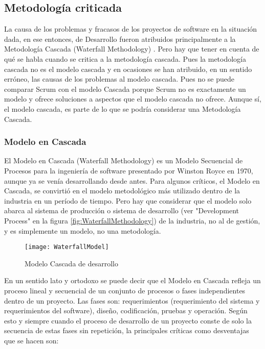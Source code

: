 \subsection{Metodología criticada}

La causa de los problemas y fracasos de los proyectos de software en la situación dada, en ese entonces, de Desarrollo fueron atribuidos principalmente a la Metodología Cascada (Waterfall Methodology) \cite{Ken-Schwaber-1995}. Pero hay que tener en cuenta de qué se habla cuando se critica a la metodología cascada. Pues la metodología cascada no es el modelo cascada y en ocasiones se han atribuido, en un sentido erróneo, las causas de los problemas al modelo cascada. Pues no se puede comparar Scrum con el modelo Cascada porque Scrum no es exactamente un modelo y ofrece soluciones a aspectos que el modelo cascada no ofrece. Aunque sí, el modelo cascada, es parte de lo que se podría considerar una Metodología Cascada. 

\subsubsection{Modelo en Cascada}

El Modelo en Cascada (Waterfall Methodology) \cite{Ken-Schwaber-1995} es un Modelo Secuencial de Procesos para la ingeniería de software presentado por Winston Royce en 1970, aunque ya se venía desarrollando desde antes. Para algunos críticos, el Modelo en Cascada, se convirtió en el modelo metodológico más utilizado dentro de la industria en un período de tiempo. Pero hay que considerar que el modelo solo abarca al sistema de producción o sistema de desarrollo (ver "Development Process" en la figura \ref{fig:WaterfallMethodology}) de la industria, no al de gestión, y es simplemente un modelo, no una metodología.

\begin{figure}[h]
  \centering
  \texttt{[image: WaterfallModel]}
  \caption{Modelo Cascada de desarrollo}
  \centering
  \label{fig:WaterfallModel} %
\end{figure}

En un sentido lato y ortodoxo se puede decir que el Modelo en Cascada refleja un proceso lineal y secuencial de un conjunto de procesos o fases independientes dentro de un proyecto. Las fases son: requerimientos (requerimiento del sistema y requerimientos del software), diseño, codificación, pruebas y operación. Según esto y siempre cuando el proceso de desarrollo de un proyecto conste de solo la secuencia de estas fases sin repetición, la principales críticas como desventajas que se hacen son:

